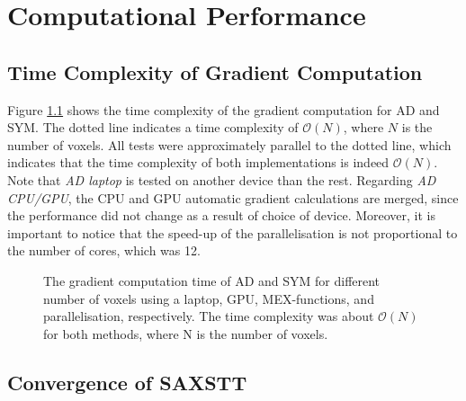 \chapter{Computational Performance}



\section{Time Complexity of Gradient Computation}

Figure \ref{fig:gradient_time_complexity} shows the time complexity of the gradient computation for AD and SYM.
The dotted line indicates a time complexity of $\mathcal{O}(N)$, where $N$ is the number of voxels.
All tests were approximately parallel to the dotted line, which indicates that the time complexity of both implementations is indeed $\mathcal{O}(N)$.
Note that \emph{AD laptop} is tested on another device than the rest.
Regarding \emph{AD CPU/GPU}, the CPU and GPU automatic gradient calculations are merged, since the performance did not change as a result of choice of device.%
Moreover, it is important to notice that the speed-up of the parallelisation is not proportional to the number of cores, which was 12.
\begin{figure}[h!]
    \centering
    
    \caption{ The gradient computation time of AD and SYM for different number of voxels using a laptop, GPU, MEX-functions, and parallelisation, respectively. %
        The time complexity was about $\mathcal{O}(N)$ for both methods, where N is the number of voxels.}
    \label{fig:gradient_time_complexity}
\end{figure}

\clearpage
\section{Convergence of SAXSTT}

